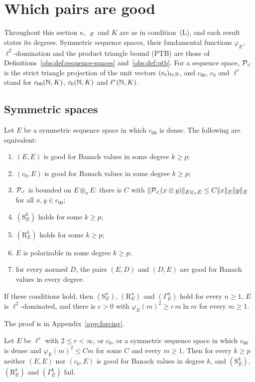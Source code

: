 \section{Which pairs are good}\label{sec:classification}

Throughout this section $\kappa$, $\varrho$ and $K$ are as in condition~\textup{(L)}, and each result states its degrees. Symmetric sequence spaces,
their fundamental functions $\varphi_E$, $\ell^2$\nobreakdash-domination and the product triangle bound \textup{(PTB)}
are those of Definitions~\ref{obs:def:sequence-spaces} and~\ref{obs:def:ptb}. For a sequence space, $\mathcal P_<$ is the
strict triangle projection of the unit vectors $(e_t)_{t\in\mathbb N}$, and $c_{00}$, $c_0$ and $\ell^r$ stand for
$c_{00}(\mathbb N,K)$, $c_0(\mathbb N,K)$ and $\ell^r(\mathbb N,K)$.

\subsection{Symmetric spaces}

\begin{theorem}\label{cls:thm:symmetric}
Let $E$ be a symmetric sequence space in which $c_{00}$ is dense. The following are equivalent:
\begin{enumerate}
\item $(E,E)$ is good for Banach values in some degree $k\ge p$;
\item $(c_0,E)$ is good for Banach values in some degree $k\ge p$;
\item $\mathcal P_<$ is bounded on $E\otimes_\pi E$: there is $C$ with
$\lVert \mathcal P_<(x\otimes y)\rVert_{E\otimes_\pi E}\le C\lVert x\rVert_E\lVert y\rVert_E$ for all $x,y\in c_{00}$;
\item $(\mathrm S^k_E)$ holds for some $k\ge p$;
\item $(\mathrm R^k_E)$ holds for some $k\ge p$;
\item $E$ is polarizable in some degree $k\ge p$;
\item for every normed $D$, the pairs $(E,D)$ and $(D,E)$ are good for Banach values in every degree.
\end{enumerate}
If these conditions hold, then $(\mathrm S^n_E)$, $(\mathrm R^n_E)$ and $(\Gamma^n_E)$ hold for every $n\ge1$, $E$ is
$\ell^2$\nobreakdash-dominated, and there is $c>0$ with $\varphi_E(m)^2\ge c\,m\ln m$ for every $m\ge1$.
\end{theorem}

The proof is in Appendix~\ref{app:forcing}.

\begin{corollary}\label{cls:cor:symmetric-examples}
Let $E$ be $\ell^r$ with $2\le r<\infty$, or $c_0$, or a symmetric sequence space in which $c_{00}$ is dense and
$\varphi_E(m)^2\le Cm$ for some $C$ and every $m\ge1$. Then for every $k\ge p$ neither $(E,E)$ nor $(c_0,E)$ is good for
Banach values in degree $k$, and $(\mathrm S^k_E)$, $(\mathrm R^k_E)$ and $(\Gamma^k_E)$ fail.
\end{corollary}

